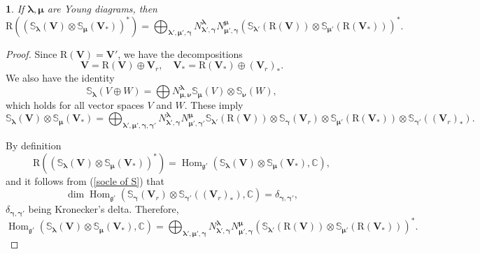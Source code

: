 \documentclass[12pt,oneside,english]{amsart}
\numberwithin{equation}{section}
\numberwithin{figure}{section}
\theoremstyle{plain}
\theoremstyle{plain}
\newtheorem{lem}[thm]{\protect\lemmaname}
\theoremstyle{remark}
\theoremstyle{definition}
\theoremstyle{plain}
\theoremstyle{remark}
\theoremstyle{definition}
\theoremstyle{plain}
\theoremstyle{plain}
\theoremstyle{definition}
\providecommand{\lemmaname}{Lemma}
\newcommand{\bV}{\mathbf{V}}
\newcommand{\Hom}{\operatorname{Hom}}
\newcommand{\fg}{\mathfrak{g}}
\begin{document}
  \begin{lem}\label{lem:identity} If $\boldsymbol{\lambda},\boldsymbol{\mu}$ are Young diagrams, then
    $$\mathrm{R}((\mathbb{S}_{\boldsymbol{\lambda}}(\bV)\otimes \mathbb{S}_{{\boldsymbol{\mu}}}(\bV_*))^*)=\bigoplus_{\boldsymbol{\lambda'},\boldsymbol{\mu'},{\boldsymbol{\gamma}}} N^{\boldsymbol{\lambda}}_{\boldsymbol{\lambda}',{\boldsymbol{\gamma}}}N^{{\boldsymbol{\mu}}}_{{\boldsymbol{\mu}}',{\boldsymbol{\gamma}}}(\mathbb{S}_{\boldsymbol{\lambda}'}(\mathrm{R}(\bV))\otimes \mathbb{S}_{{\boldsymbol{\mu}}'}(\mathrm{R}(\bV_*)))^*.$$
  \end{lem}
  \begin{proof} Since $\mathrm{R}(\bV)=\bV'$, we have the decompositions
    $$\bV=\mathrm{R}(\bV)\oplus\bV_r,\quad\bV_*=\mathrm{R}(\bV_*)\oplus(\bV_r)_*.$$
    We also have the identity
    \begin{equation}\label{Schur}
      \mathbb{S}_{\boldsymbol{\lambda}}(V\oplus W)=\bigoplus N^{\boldsymbol{\lambda}}_{{\boldsymbol{\mu}},{\boldsymbol{\nu}}}\mathbb{S}_{\boldsymbol{\mu}}(V)\otimes \mathbb{S}_{{\boldsymbol{\nu}}}(W), \end{equation}
    which holds for all vector spaces $V$ and $W$.
     These imply
    $$\mathbb{S}_{\boldsymbol{\lambda}}(\bV)\otimes \mathbb{S}_{{\boldsymbol{\mu}}}(\bV_*)=\bigoplus_{\boldsymbol{\lambda'},\boldsymbol{\mu'},{\boldsymbol{\gamma}},{\boldsymbol{\gamma}}'} N^{\boldsymbol{\lambda}}_{\boldsymbol{\lambda}',{\boldsymbol{\gamma}}}N^{{\boldsymbol{\mu}}}_{{\boldsymbol{\mu}}',{\boldsymbol{\gamma}}'}\mathbb{S}_{\boldsymbol{\lambda}'}(\mathrm{R}(\bV))\otimes
    \mathbb{S}_{{\boldsymbol{\gamma}}}(\bV_r)\otimes \mathbb{S}_{{\boldsymbol{\mu}}'}(\mathrm{R}(\bV_*))\otimes \mathbb{S}_{{\boldsymbol{\gamma}}'}((\bV_r)_*).$$

 By definition
    $$\mathrm{R}((\mathbb{S}_{\boldsymbol{\lambda}}(\bV)\otimes \mathbb{S}_{{\boldsymbol{\mu}}}(\bV_*))^*)=\operatorname{Hom}_{\fg'}(\mathbb{S}_{\boldsymbol{\lambda}}(\bV)\otimes \mathbb{S}_{{\boldsymbol{\mu}}}(\bV_*),\mathbb C),$$
  and it follows from (\ref{socle of S}) that
    $$\dim\Hom_{\fg'}(\mathbb{S}_{{\boldsymbol{\gamma}}}(\bV_r)\otimes  \mathbb{S}_{{\boldsymbol{\gamma}}'}((\bV_r)_*),\mathbb C)=\delta_{{\boldsymbol{\gamma}},{\boldsymbol{\gamma}}'},$$
$\delta_{{\boldsymbol{\gamma}},{\boldsymbol{\gamma}}'}$ being Kronecker's delta.
 Therefore,
    $$\operatorname{Hom}_{\fg'}(\mathbb{S}_{\boldsymbol{\lambda}}(\bV)\otimes \mathbb{S}_{{\boldsymbol{\mu}}}(\bV_*),\mathbb C)=\bigoplus_{\boldsymbol{\lambda'},\boldsymbol{\mu'},{\boldsymbol{\gamma}}} N^{\boldsymbol{\lambda}}_{\boldsymbol{\lambda}',{\boldsymbol{\gamma}}}N^{{\boldsymbol{\mu}}}_{{\boldsymbol{\mu}}',{\boldsymbol{\gamma}}}(\mathbb{S}_{\boldsymbol{\lambda}'}(\mathrm{R}(\bV))\otimes \mathbb{S}_{{\boldsymbol{\mu}}'}(\mathrm{R}(\bV_*)))^*.$$
    \end{proof}
\end{document}
